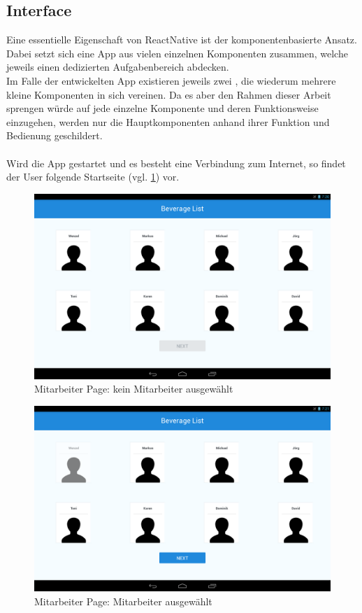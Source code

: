 \subsection{Interface}
\label{subsec:interface}
Eine essentielle Eigenschaft von ReactNative ist der komponentenbasierte Ansatz. Dabei setzt sich eine App aus vielen einzelnen Komponenten zusammen, welche jeweils einen dedizierten Aufgabenbereich abdecken. \\
Im Falle der entwickelten App existieren jeweils zwei , die wiederum mehrere kleine Komponenten in sich vereinen. 
Da es aber den Rahmen dieser Arbeit sprengen würde auf jede einzelne Komponente und deren Funktionsweise einzugehen, werden nur die Hauptkomponenten anhand ihrer Funktion und Bedienung geschildert. \\\\
Wird die App gestartet und es besteht eine Verbindung zum Internet, so findet der User folgende Startseite (vgl. \ref{img:emps1}) vor.

\begin{figure}[th!]
	\centering
	\includegraphics[width=.9\columnwidth]{./Abbildungen/Kapitel_03/emps1.png}
	\caption{Mitarbeiter Page: kein Mitarbeiter ausgewählt}
	\label{img:emps1}
\end{figure}

\begin{figure}[th!]
	\centering
	\includegraphics[width=.9\columnwidth]{./Abbildungen/Kapitel_03/emps2.png}
	\caption{Mitarbeiter Page: Mitarbeiter ausgewählt}
	\label{img:emps2}
\end{figure}

